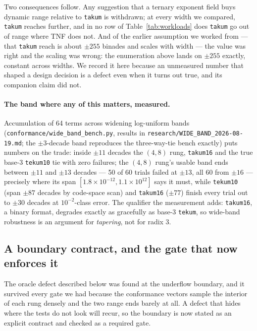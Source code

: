 \documentclass[11pt]{article}
\theoremstyle{definition}
\begin{document}
Two consequences follow. Any suggestion that a ternary exponent field buys
dynamic range relative to \texttt{takum} is withdrawn; at every width we compared,
\texttt{takum} reaches further, and in no row of Table~\ref{tab:workloads} does
\texttt{takum} go out of range where TNF does not. And of the earlier assumption we
worked from --- that \texttt{takum} reach is about $\pm 255$ binades and scales
with width --- the value was right and the scaling was wrong: the enumeration
above lands on $\pm 255$ exactly, constant across widths. We record it here
because an unmeasured number that shaped a design decision is a defect even
when it turns out true, and its companion claim did not.

\paragraph{The band where any of this matters, measured.} Accumulation of 64
terms across widening log-uniform bands (\texttt{conformance/wide\_band\_bench.py},
results in \texttt{research/WIDE\_BAND\_2026-08-19.md}; the $\pm 3$-decade band
reproduces the three-way-tie bench exactly) puts numbers on the trade: inside
$\pm 11$ decades the $(4,8)$ rung, \texttt{takum16} and the true base-3
\texttt{tekum10} tie with zero failures; the $(4,8)$ rung's usable band ends
between $\pm 11$ and $\pm 13$ decades --- 50 of 60 trials failed at $\pm 13$,
all 60 from $\pm 16$ --- precisely where its span $[1.8 \times 10^{-12},
1.1 \times 10^{12}]$ says it must, while \texttt{tekum10} (span $\pm 87$
decades by code-space scan) and \texttt{takum16} ($\pm 77$) finish every trial
out to $\pm 30$ decades at $10^{-2}$-class error. The qualifier the measurement
adds: \texttt{takum16}, a binary format, degrades exactly as gracefully as
base-3 \texttt{tekum}, so wide-band robustness is an argument for
\emph{tapering}, not for radix 3.

\subsection{A boundary contract, and the gate that now enforces it}
\label{sec:boundarygate}

The oracle defect described below was found at the underflow boundary, and it
survived every gate we had because the conformance vectors sample the interior of
each rung densely and the two range ends barely at all. A defect that hides where
the tests do not look will recur, so the boundary is now stated as an explicit
contract and checked as a required gate.
\end{document}
